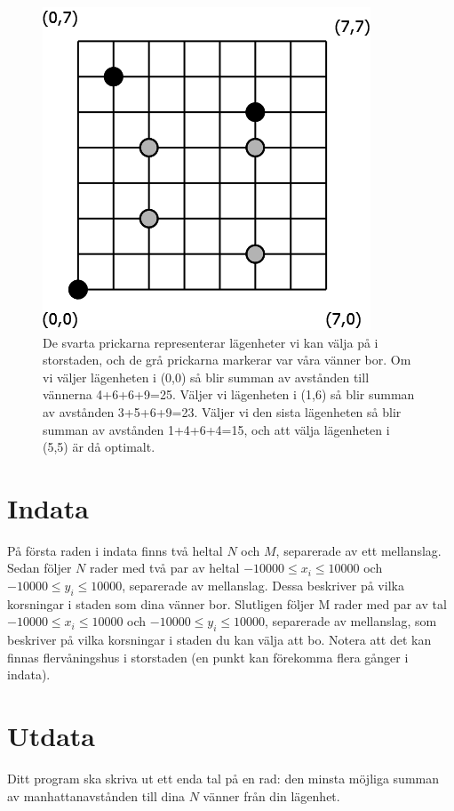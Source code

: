 \begin{figure}[!h]
\begin{center}
\includegraphics[scale=0.4]{Storstad}
\end{center}
\caption{De svarta prickarna representerar lägenheter vi kan välja på i storstaden, och de grå prickarna markerar var våra vänner bor. Om vi väljer lägenheten i (0,0) så blir summan av avstånden till vännerna 4+6+6+9=25. Väljer vi lägenheten i (1,6) så blir summan av avstånden 3+5+6+9=23. Väljer vi den sista lägenheten så blir summan av avstånden 1+4+6+4=15, och att välja lägenheten i (5,5) är då optimalt.}
\label{fig1}
\end{figure}

\section*{Indata}
På första raden i indata finns två heltal $N$ och $M$, separerade av ett mellanslag. Sedan följer $N$ rader med två par av heltal $-10 000 \leq x_i \leq 10 000$ och $-10 000 \leq y_i \leq 10 000$, separerade av mellanslag. Dessa beskriver på vilka korsningar i staden som dina vänner bor. Slutligen följer M rader med par av tal $-10 000 \leq x_i \leq 10 000$ och $-10 000 \leq y_i \leq 10 000$, separerade av mellanslag, som beskriver på vilka korsningar i staden du kan välja att bo. Notera att det kan finnas flervåningshus i storstaden (en punkt kan förekomma flera gånger i indata).

\section*{Utdata}
Ditt program ska skriva ut ett enda tal på en rad: den minsta möjliga summan av manhattanavstånden till dina $N$ vänner från din lägenhet.
